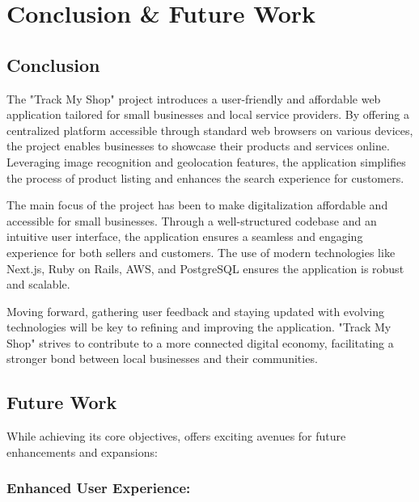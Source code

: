 
\chapter{Conclusion \& Future Work} %

\label{Chapter5} %



\section{Conclusion}
The "Track My Shop" project introduces a user-friendly and affordable web application tailored for small businesses and local service providers. By offering a centralized platform accessible through standard web browsers on various devices, the project enables businesses to showcase their products and services online. Leveraging image recognition and geolocation features, the application simplifies the process of product listing and enhances the search experience for customers.

The main focus of the project has been to make digitalization affordable and accessible for small businesses. Through a well-structured codebase and an intuitive user interface, the application ensures a seamless and engaging experience for both sellers and customers. The use of modern technologies like Next.js, Ruby on Rails, AWS, and PostgreSQL ensures the application is robust and scalable.

Moving forward, gathering user feedback and staying updated with evolving technologies will be key to refining and improving the application. "Track My Shop" strives to contribute to a more connected digital economy, facilitating a stronger bond between local businesses and their communities.


\section{Future Work}
While achieving its core objectives, offers exciting avenues for future enhancements and expansions:

\subsection{Enhanced User Experience:}

